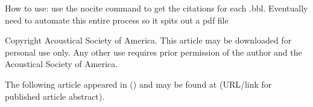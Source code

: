 \documentclass{article}
\begin{document}
How to use: use the nocite command to get the citations for each .bbl. Eventually need to automate this entire process so it spits out a pdf file


Copyright \citeyear{spherical_piston} Acoustical Society of America. This article may be downloaded for personal use only. Any other use requires prior permission of the author and the Acoustical Society of America. 

\cite{ircam_speech}
The following article appeared in () and may be found at (URL/link for published article abstract).

\printbibliography
\end{document}

